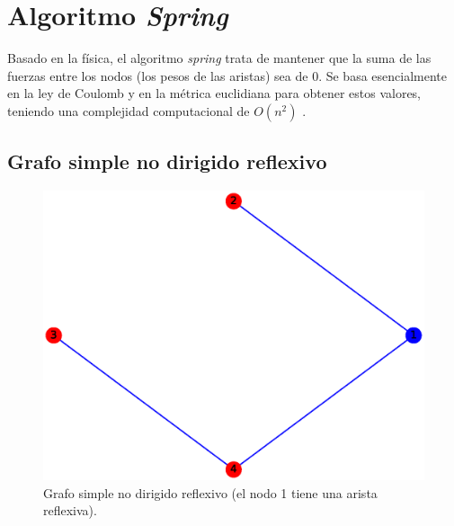 \documentclass{article}
\begin{document}
\section{Algoritmo \textit{Spring}}
Basado en la física, el algoritmo \textit{spring} trata de mantener que la suma de las fuerzas entre los nodos (los pesos de las aristas) sea de 0. Se basa esencialmente en la ley de Coulomb y en la métrica euclidiana para obtener estos valores, teniendo una complejidad computacional de $O(n^2)$ \cite{spring}.

\subsection{Grafo simple no dirigido reflexivo}
\begin{figure}[H]
    \includegraphics[width=\textwidth]{3-GSNDC}
    \caption{Grafo simple no dirigido reflexivo (el nodo 1 tiene una arista reflexiva).}
    \label{fig:GSNDR}
\end{figure}
\end{document}
